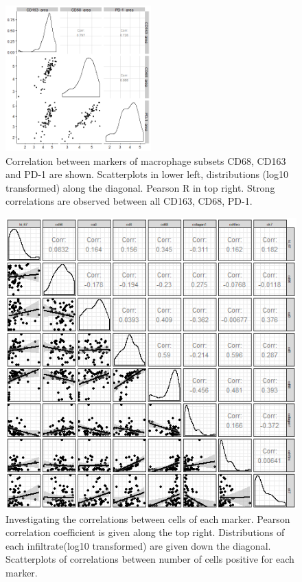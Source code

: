 \begin{figure}
    \centering
    \includegraphics[width=0.5\textwidth]{Chapter4/figs/BRITROC_CD163_CD68_PD-1_corr.png}
    \caption[Correlation between markers of macrophage subsets CD68, CD163 and PD-1]{Correlation between markers of macrophage subsets CD68, CD163 and PD-1 are shown. Scatterplots in lower left, distributions (log10 transformed) along the diagonal. Pearson R in top right. Strong correlations are observed between all CD163, CD68, PD-1.}
    \label{fig:CD163_CD8_PD1}
\end{figure}

\begin{figure}
    \centering
    \includegraphics{Chapter4/figs/Britroc_cell_correlation2.png}
    \caption[Investigating the correlations between cells of each marker in IMC data.]{Investigating the correlations between cells of each marker. Pearson correlation coefficient is given along the top right. Distributions of each infiltrate(log10 transformed) are given down the diagonal. Scatterplots of correlations between number of cells positive for each marker.}
    \label{fig:britroc_corr_scatt}
\end{figure}

